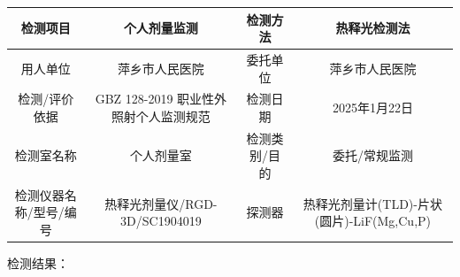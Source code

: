 \begin{table}[H]
\centering
\begin{tabular}{|c|c|c|c|}
\hline
检测项目 & 个人剂量监测 & 检测方法 & 热释光检测法 \\
\hline
用人单位 & 萍乡市人民医院 & 委托单位 & 萍乡市人民医院 \\
\hline
检测/评价依据 & GBZ 128-2019 职业性外照射个人监测规范 & 检测日期 & 2025年1月22日 \\
\hline
检测室名称 & 个人剂量室 & 检测类别/目的 & 委托/常规监测 \\
\hline
检测仪器名称/型号/编号 & 热释光剂量仪/RGD-3D/SC1904019 & 探测器 & 热释光剂量计(TLD)-片状(圆片)-LiF(Mg,Cu,P) \\
\hline
\end{tabular}
\end{table}


检测结果：

